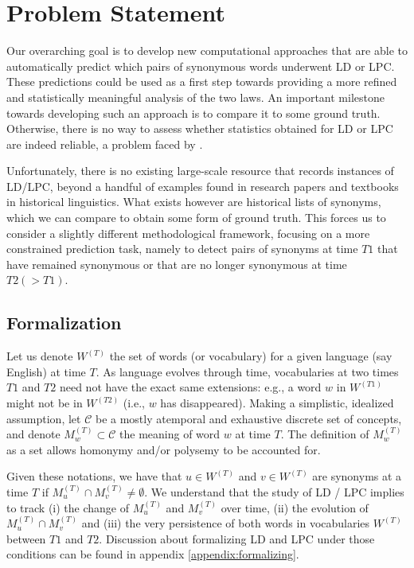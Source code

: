\documentclass[11pt]{article}
\newcommand{\vocab}{W}
\newcommand{\firstTime}{T1}
\newcommand{\secondTime}{T2}
\begin{document}
\section{Problem Statement}
\label{ProblemStatement}

Our overarching goal is to develop new computational approaches that are able to automatically predict which pairs of synonymous words underwent LD or LPC. These predictions could be used as a first step towards providing a more refined and statistically meaningful analysis of the two laws. An important milestone towards developing such an approach is to compare it to some ground truth. Otherwise, there is no way to assess whether statistics obtained for LD or LPC are indeed reliable, a problem faced by \citet{xu-kemp-2015-evaluation}.

Unfortunately, there is no existing large-scale resource that records instances of LD/LPC, beyond a handful of examples found in research papers and textbooks in historical linguistics. What exists however are historical lists of synonyms, which we can compare to obtain some form of ground truth. This forces us to consider a slightly different methodological framework, focusing on a more constrained prediction task, namely to detect pairs of synonyms at time $T1$ that have remained synonymous or that are no longer synonymous at time $T2 (>T1)$. 

\subsection{Formalization}
\label{sec:formalization}

Let us denote $\vocab^{(T)}$ the set of words (or vocabulary) for a given language (say English) at time $T$. As language evolves through time, vocabularies at two times $T1$ and $T2$ 
need not have the exact same extensions: e.g., a word $w$ in $\vocab^{(T1)}$ might not be in $\vocab^{(T2)}$ (i.e., $w$ has disappeared). Making a simplistic, idealized assumption, let $\mathcal{C}$ be a mostly atemporal and exhaustive discrete set of concepts, and denote $M_w^{(T)}\subset \mathcal{C}$ the meaning of word $w$ at time $T$. The definition of $M_w^{(T)}$ as a set allows homonymy and/or polysemy to be accounted for. 

Given these notations, we have that $u\in\vocab^{(T)}$ and $v\in\vocab^{(T)}$ are synonyms at a time $T$ if $M_u^{(T)}\cap M_v^{(T)}\neq\emptyset$. We understand that the study of LD / LPC implies to track (i) the change of $M_u^{(T)}$ and $M_v^{(T)}$ over time, (ii) the evolution of $M_u^{(T)} \cap M_v^{(T)}$ and (iii) the very persistence of both words in vocabularies $\vocab^{(T)}$ between $\firstTime$ and $\secondTime$. Discussion about formalizing LD and LPC under those conditions can be found in appendix \ref{appendix:formalizing}.
\end{document}
